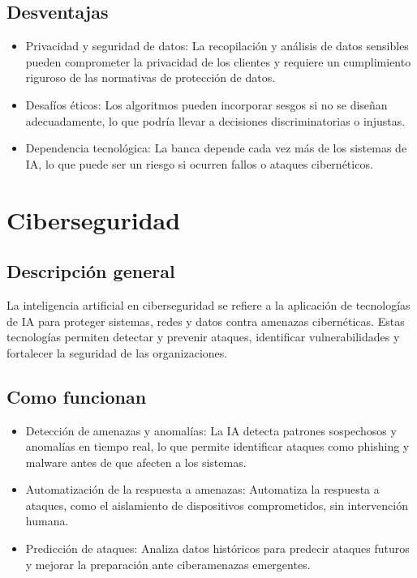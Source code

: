 \documentclass[12pt]{article}
\begin{document}
\subsection{Desventajas}

\begin{itemize}
    \item Privacidad y seguridad de datos: 
    La recopilación y análisis de datos sensibles pueden comprometer la privacidad de los clientes y requiere un cumplimiento
    riguroso de las normativas de protección de datos.
    \item Desafíos éticos: 
    Los algoritmos pueden incorporar sesgos si no se diseñan adecuadamente, lo que podría llevar a decisiones discriminatorias 
    o injustas.
    \item Dependencia tecnológica: 
    La banca depende cada vez más de los sistemas de IA, lo que puede ser un riesgo si ocurren fallos o ataques cibernéticos.    
\end{itemize}

\section{Ciberseguridad}

\subsection{Descripción general}

La inteligencia artificial en ciberseguridad se refiere a la aplicación de tecnologías de IA para proteger sistemas, redes y datos
contra amenazas cibernéticas. Estas tecnologías permiten detectar y prevenir ataques, identificar vulnerabilidades y fortalecer la
seguridad de las organizaciones.

\subsection{Como funcionan}

\begin{itemize}
    \item Detección de amenazas y anomalías: 
    La IA detecta patrones sospechosos y anomalías en tiempo real, lo que permite identificar ataques como phishing y
    malware antes de que afecten a los sistemas.
    \item Automatización de la respuesta a amenazas: 
    Automatiza la respuesta a ataques, como el aislamiento de dispositivos comprometidos, sin intervención humana.
    \item Predicción de ataques: 
    Analiza datos históricos para predecir ataques futuros y mejorar la preparación ante ciberamenazas emergentes.        
\end{itemize}
\end{document}

